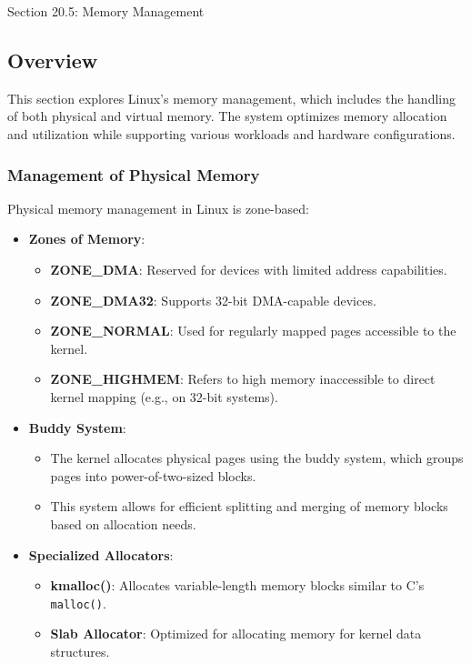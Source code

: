\begin{notes}{Section 20.5: Memory Management}
    \subsection*{Overview}

    This section explores Linux's memory management, which includes the handling of both physical and virtual memory. The system optimizes memory allocation and utilization while supporting various 
    workloads and hardware configurations.
    
    \subsubsection*{Management of Physical Memory}
    
    Physical memory management in Linux is zone-based:
    \begin{itemize}
        \item \textbf{Zones of Memory}:
        \begin{itemize}
            \item \textbf{ZONE\_DMA}: Reserved for devices with limited address capabilities.
            \item \textbf{ZONE\_DMA32}: Supports 32-bit DMA-capable devices.
            \item \textbf{ZONE\_NORMAL}: Used for regularly mapped pages accessible to the kernel.
            \item \textbf{ZONE\_HIGHMEM}: Refers to high memory inaccessible to direct kernel mapping (e.g., on 32-bit systems).
        \end{itemize}
        \item \textbf{Buddy System}:
        \begin{itemize}
            \item The kernel allocates physical pages using the buddy system, which groups pages into power-of-two-sized blocks.
            \item This system allows for efficient splitting and merging of memory blocks based on allocation needs.
        \end{itemize}
        \item \textbf{Specialized Allocators}:
        \begin{itemize}
            \item \textbf{kmalloc()}: Allocates variable-length memory blocks similar to C's \texttt{malloc()}.
            \item \textbf{Slab Allocator}: Optimized for allocating memory for kernel data structures.
        \end{itemize}
    \end{itemize}
    

\end{notes}
